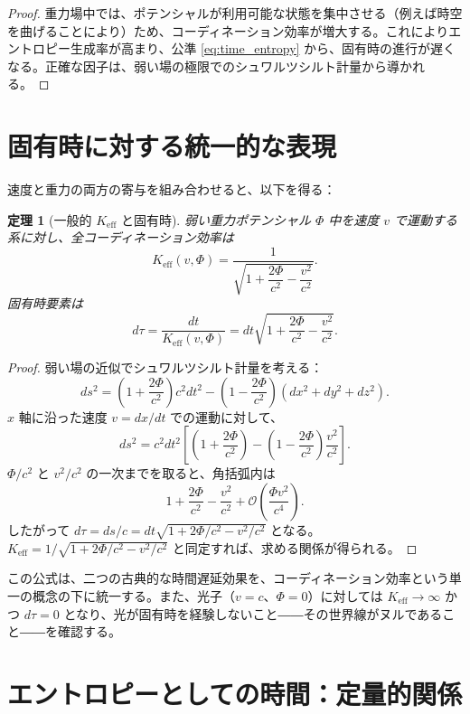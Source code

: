 \documentclass[12pt,a4paper]{article}
\newtheorem{theorem}{定理}[section]
\newcommand{\Keff}{K_{\mathrm{eff}}}
\begin{document}
	\begin{proof}
		重力場中では、ポテンシャルが利用可能な状態を集中させる（例えば時空を曲げることにより）ため、コーディネーション効率が増大する。これによりエントロピー生成率が高まり、公準 \ref{eq:time_entropy} から、固有時の進行が遅くなる。正確な因子は、弱い場の極限でのシュワルツシルト計量から導かれる。
	\end{proof}
	
	\section{固有時に対する統一的な表現}
	\label{sec:unified}
	
	速度と重力の両方の寄与を組み合わせると、以下を得る：
	
	\begin{theorem}[一般的 \(\Keff\) と固有時]
		弱い重力ポテンシャル \(\Phi\) 中を速度 \(v\) で運動する系に対し、全コーディネーション効率は
		\begin{equation}
			\Keff(v,\Phi) = \frac{1}{\sqrt{1 + \dfrac{2\Phi}{c^2} - \dfrac{v^2}{c^2}}}.
		\end{equation}
		固有時要素は
		\begin{equation}
			d\tau = \frac{dt}{\Keff(v,\Phi)} = dt\sqrt{1 + \frac{2\Phi}{c^2} - \frac{v^2}{c^2}}.
		\end{equation}
	\end{theorem}
	
	\begin{proof}
		弱い場の近似でシュワルツシルト計量を考える：
		\[
		ds^2 = \left(1+\frac{2\Phi}{c^2}\right)c^2 dt^2 - \left(1-\frac{2\Phi}{c^2}\right)(dx^2+dy^2+dz^2).
		\]
		\(x\) 軸に沿った速度 \(v = dx/dt\) での運動に対して、
		\[
		ds^2 = c^2 dt^2\left[ \left(1+\frac{2\Phi}{c^2}\right) - \left(1-\frac{2\Phi}{c^2}\right)\frac{v^2}{c^2} \right].
		\]
		\(\Phi/c^2\) と \(v^2/c^2\) の一次までを取ると、角括弧内は
		\[
		1 + \frac{2\Phi}{c^2} - \frac{v^2}{c^2} + \mathcal{O}\left(\frac{\Phi v^2}{c^4}\right).
		\]
		したがって \(d\tau = ds/c = dt\sqrt{1 + 2\Phi/c^2 - v^2/c^2}\) となる。\(\Keff = 1/\sqrt{1 + 2\Phi/c^2 - v^2/c^2}\) と同定すれば、求める関係が得られる。
	\end{proof}
	
	この公式は、二つの古典的な時間遅延効果を、コーディネーション効率という単一の概念の下に統一する。また、光子（\(v=c\)、\(\Phi=0\)）に対しては \(\Keff \to \infty\) かつ \(d\tau = 0\) となり、光が固有時を経験しないこと――その世界線がヌルであること――を確認する。
	
	\section{エントロピーとしての時間：定量的関係}
	\label{sec:entropy}
	
\end{document}
